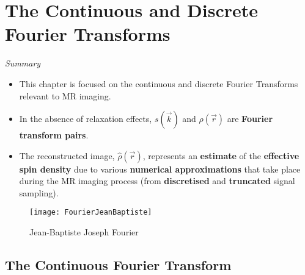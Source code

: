 \section{The Continuous and Discrete Fourier Transforms}
\label{ch:11}

\textit{Summary}
\begin{itemize}
    \item This chapter is focused on the continuous and discrete Fourier Transforms relevant to MR imaging.

    \item In the absence of relaxation effects, $s(\vec{k})$ and $\rho(\vec{r})$ are \textbf{Fourier transform pairs}.

    \item The reconstructed image, $\hat{\rho}(\vec{r})$, represents an \textbf{estimate} of the \textbf{effective spin density} due to various \textbf{numerical approximations} that take place during the MR imaging process (from \textbf{discretised} and \textbf{truncated} signal sampling).    
\end{itemize}

\begin{figure}[H]
    \centering
    \texttt{[image: FourierJeanBaptiste]}
    \caption{Jean-Baptiste Joseph Fourier \courtesywiki}
    \label{fig:FourierJeanBaptiste}
\end{figure}


\clearpage
\subsection{The Continuous Fourier Transform}

